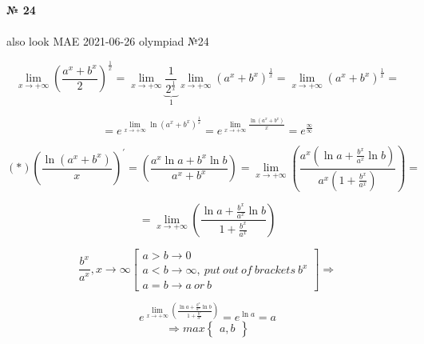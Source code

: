 \documentclass{article}
\begin{document}
\textbf{№ 24}
\\
\\ also look MAE 2021-06-26 olympiad №24

$$ \lim_{x\to+\infty} \left( {\frac{a^x+b^x}{2}}\right)^{\frac{1}{x}} 
= \lim_{x\to+\infty} \underbrace{\frac{1}{2^\frac{1}{x}}}_{1} \lim_{x\to+\infty}\left( {a^x+b^x}\right)^{\frac{1}{x}} 
= \lim_{x\to+\infty}\left( {a^x+b^x}\right)^{\frac{1}{x}}
= $$

\Large
$$ = e^{\lim\limits_{x \to+\infty}\ln\left( {a^x+b^x}\right)^{\frac{1}{x}}} 
= e^{\lim\limits_{x \to+\infty} \frac{\ln\left( {a^x+b^x}\right)}{x}} 
= e^{\frac{\infty}{\infty}} $$

$$ (*) \left(\frac{\ln\left( {a^x+b^x}\right)}{x}\right)^\prime 
=  \left( \frac{a^x\ln{a}+b^x\ln{b}}{a^x+b^x} \right) 
= \lim\limits_{x \to+\infty} \left( \frac{a^x(\ln{a}+\frac{b^x}{a^x}\ln{b})}{a^x(1+\frac{b^x}{a^x})} \right) = $$

$$ = \lim\limits_{x \to+\infty} \left( \frac{\ln{a}+\frac{b^x}{a^x}\ln{b}}{1+\frac{b^x}{a^x}} \right) $$

$$ \frac{b^x}{a^x}, x\to\infty
\left[
\begin{array}{lll}
a>b \rightarrow 0 \\
a<b \rightarrow \infty, \ put \ out \ of \ brackets \ b^x \\
a=b \rightarrow a \ or \ b
\end{array}
\right] 
\Rightarrow$$

$$
e^{ \lim\limits_{x \to+\infty} \left( \frac{\ln{a}+\frac{b^x}{a^x}\ln{b}}{1+\frac{b^x}{a^x}} \right)}
= e^{\ln{a}}
= a $$
$$ \Rightarrow max\left\{
  \begin{array}{ccc} 
  a, b 
  \end{array}
\right\} $$
\end{document}
